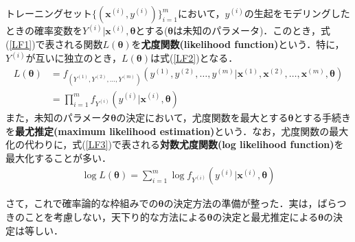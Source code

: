 \begin{defi}
トレーニングセット$\{({\bm x}^{(i)},y^{(i)})\}_{i=1}^m$において，$y^{(i)}$の生起をモデリングしたときの確率変数を$Y^{(i)}|{\bm x}^{(i)},{\bm \theta}$とする(${\bm \theta}$は未知のパラメータ)．このとき，式(\ref{LF1})で表される関数$L({\bm \theta})$を{\bf 尤度関数(likelihood function)}という．特に，$Y^{(i)}$が互いに独立のとき，$L({\bm \theta})$は式(\ref{LF2})となる．
\begin{align}
L({\bm \theta})&=f_{(Y^{(1)},Y^{(2)},\ldots,Y^{(m)})}(y^{(1)},y^{(2)},\ldots,y^{(m)}|{\bm x}^{(1)},{\bm x}^{(2)},\ldots,{\bm x}^{(m)},{\bm \theta})\label{LF1}\\
&=\prod_{i=1}^m f_{Y^{(i)}}(y^{(i)}|{\bm x}^{(i)},{\bm \theta})\label{LF2}
\end{align}
また，未知のパラメータ${\bm \theta}$の決定において，尤度関数を最大とする${\bm \theta}$とする手続きを{\bf 最尤推定(maximum likelihood estimation)}という．なお，尤度関数の最大化の代わりに，式(\ref{LF3})で表される{\bf 対数尤度関数(log likelihood function)}を最大化することが多い．
\begin{align}
\log L({\bm \theta})=\sum_{i=1}^m \log f_{Y^{(i)}}(y^{(i)}|{\bm x}^{(i)},{\bm \theta})\label{LF3}
\end{align}
\end{defi}

さて，これで確率論的な枠組みでの${\bm \theta}$の決定方法の準備が整った．実は，ばらつきのことを考慮しない，天下り的な方法による${\bm \theta}$の決定と最尤推定による${\bm \theta}$の決定は等しい．


